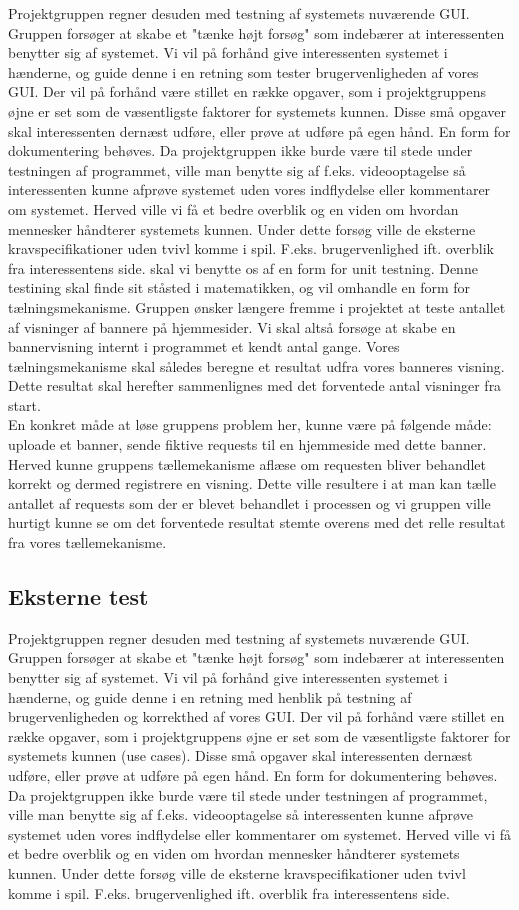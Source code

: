 \documentclass[a4paper,12pt]{article}
\begin{document}
Projektgruppen regner desuden med testning af systemets nuværende GUI. Gruppen forsøger at skabe et "tænke højt forsøg" som indebærer at interessenten benytter sig af systemet. Vi vil på forhånd give interessenten systemet i hænderne, og guide denne i en retning som tester brugervenligheden af vores GUI. Der vil på forhånd være stillet en række opgaver, som i projektgruppens øjne er set som de væsentligste faktorer for systemets kunnen. Disse små opgaver skal interessenten dernæst udføre, eller prøve at udføre på egen hånd. En form for dokumentering behøves. 
Da projektgruppen ikke burde være til stede under testningen af programmet, ville man benytte sig af f.eks. videooptagelse så interessenten kunne afprøve systemet uden vores indflydelse eller kommentarer om systemet. Herved ville vi få et bedre overblik og en viden om hvordan mennesker håndterer systemets kunnen.
Under dette forsøg ville de eksterne kravspecifikationer uden tvivl komme i spil. F.eks. brugervenlighed ift. overblik fra
interessentens side. skal vi benytte os af en form for unit testning. Denne testining skal finde sit ståsted i matematikken, og vil omhandle en form for tælningsmekanisme. Gruppen ønsker længere fremme i projektet at teste antallet af visninger af bannere på hjemmesider. Vi skal altså forsøge at skabe en bannervisning internt i programmet et kendt antal gange. Vores tælningsmekanisme skal således beregne et resultat udfra vores banneres visning. Dette resultat skal herefter sammenlignes med det forventede antal visninger fra start.
\\ 
En konkret måde at løse gruppens problem her, kunne være på følgende måde: uploade et banner, sende fiktive requests til en hjemmeside med dette banner. Herved kunne gruppens tællemekanisme aflæse om requesten bliver behandlet korrekt og dermed registrere en visning. Dette ville resultere i at man kan tælle antallet af requests som der er blevet behandlet i processen og vi gruppen ville hurtigt kunne se om det forventede resultat stemte overens med det relle resultat fra vores tællemekanisme.

\subsection{Eksterne test}Projektgruppen regner desuden med testning af systemets nuværende GUI. Gruppen forsøger at skabe et "tænke højt forsøg" som indebærer at interessenten benytter sig af systemet. Vi vil på forhånd give interessenten systemet i hænderne, og guide denne i en retning med henblik på testning af brugervenligheden og korrekthed af vores GUI. Der vil på forhånd være stillet en række opgaver, som i projektgruppens øjne er set som de væsentligste faktorer for systemets kunnen (use cases). Disse små opgaver skal interessenten dernæst udføre, eller prøve at udføre på egen hånd. En form for dokumentering behøves. 
Da projektgruppen ikke burde være til stede under testningen af programmet, ville man benytte sig af f.eks. videooptagelse så interessenten kunne afprøve systemet uden vores indflydelse eller kommentarer om systemet. Herved ville vi få et bedre overblik og en viden om hvordan mennesker håndterer systemets kunnen.
Under dette forsøg ville de eksterne kravspecifikationer uden tvivl komme i spil. F.eks. brugervenlighed ift. overblik fra
interessentens side.
\end{document}
